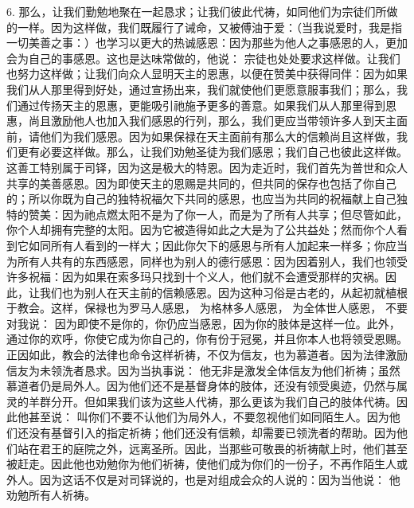 6. 那么，让我们勤勉地聚在一起恳求；让我们彼此代祷，如同他们为宗徒们所做的一样。因为这样做，我们既履行了诫命，又被傅油于爱：（当我说爱时，我是指一切美善之事：）也学习以更大的热诚感恩：因为那些为他人之事感恩的人，更加会为自己的事感恩。这也是达味常做的，他说： 宗徒也处处要求这样做。让我们也努力这样做；让我们向众人显明天主的恩惠，以便在赞美中获得同伴：因为如果我们从人那里得到好处，通过宣扬出来，我们就使他们更愿意服事我们；那么，我们通过传扬天主的恩惠，更能吸引祂施予更多的善意。如果我们从人那里得到恩惠，尚且激励他人也加入我们感恩的行列，那么，我们更应当带领许多人到天主面前，请他们为我们感恩。因为如果保禄在天主面前有那么大的信赖尚且这样做，我们更有必要这样做。那么，让我们劝勉圣徒为我们感恩；我们自己也彼此这样做。这善工特别属于司铎，因为这是极大的特恩。因为走近时，我们首先为普世和众人共享的美善感恩。因为即使天主的恩赐是共同的，但共同的保存也包括了你自己的；所以你既为自己的独特祝福欠下共同的感恩，也应当为共同的祝福献上自己独特的赞美：因为祂点燃太阳不是为了你一人，而是为了所有人共享；但尽管如此，你个人却拥有完整的太阳。因为它被造得如此之大是为了公共益处；然而你个人看到它如同所有人看到的一样大；因此你欠下的感恩与所有人加起来一样多；你应当为所有人共有的东西感恩，同样也为别人的德行感恩：因为因着别人，我们也领受许多祝福：因为如果在索多玛只找到十个义人，他们就不会遭受那样的灾祸。因此，让我们也为别人在天主前的信赖感恩。因为这种习俗是古老的，从起初就植根于教会。这样，保禄也为罗马人感恩， 为格林多人感恩， 为全体世人感恩， 不要对我说： 因为即使不是你的，你仍应当感恩，因为你的肢体是这样一位。此外，通过你的欢呼，你使它成为你自己的，你有份于冠冕，并且你本人也将领受恩赐。正因如此，教会的法律也命令这样祈祷，不仅为信友，也为慕道者。因为法律激励信友为未领洗者恳求。因为当执事说： 他无非是激发全体信友为他们祈祷；虽然慕道者仍是局外人。因为他们还不是基督身体的肢体，还没有领受奥迹，仍然与属灵的羊群分开。但如果我们该为这些人代祷，那么更该为我们自己的肢体代祷。因此他甚至说： 叫你们不要不认他们为局外人，不要忽视他们如同陌生人。因为他们还没有基督引入的指定祈祷；他们还没有信赖，却需要已领洗者的帮助。因为他们站在君王的庭院之外，远离圣所。因此，当那些可敬畏的祈祷献上时，他们甚至被赶走。因此他也劝勉你为他们祈祷，使他们成为你们的一份子，不再作陌生人或外人。因为这话不仅是对司铎说的，也是对组成会众的人说的：因为当他说： 他劝勉所有人祈祷。\par

